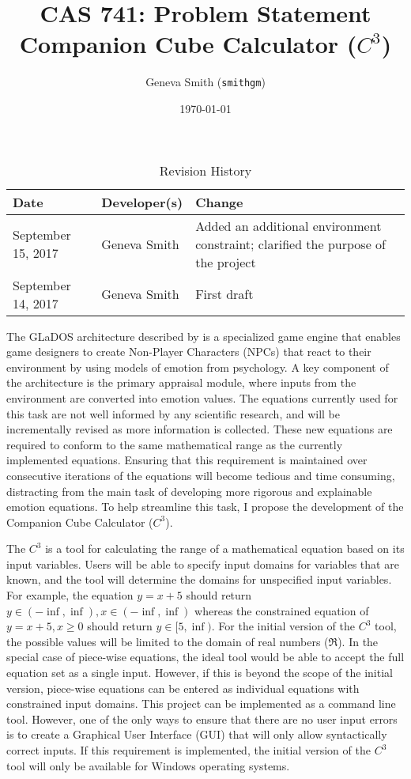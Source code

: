 \documentclass{article}
\title{CAS 741: Problem Statement\\Companion Cube Calculator ($C^{3}$)}
\author{Geneva Smith (\texttt{smithgm})}
\date{\today}
\begin{document}
\maketitle

\begin{table}[hp]
\caption{Revision History} \label{TblRevisionHistory}
\begin{tabularx}{\textwidth}{llX}
\toprule
\textbf{Date} & \textbf{Developer(s)} & \textbf{Change}\\
\midrule
September 15, 2017 & Geneva Smith & Added an additional environment constraint; 
clarified the purpose of the project \\
September 14, 2017 & Geneva Smith & First draft \\
\bottomrule
\end{tabularx}
\end{table}

The GLaDOS architecture described by \citet{glados} is a specialized game 
engine that enables game designers to create Non-Player Characters (NPCs) that 
react to their environment by using models of emotion from psychology. A key 
component of the architecture is the primary appraisal module, where inputs 
from the environment are converted into emotion values. The equations currently 
used for this task are not well informed by any scientific research, and will 
be incrementally revised as more information is collected. These new equations 
are required to conform to the same mathematical range as the currently 
implemented equations. Ensuring that this requirement is maintained over 
consecutive iterations of the equations will become tedious and time consuming, 
distracting from the main task of developing more rigorous and explainable 
emotion equations. To help streamline this task, I propose the development of 
the Companion Cube Calculator ($C^{3}$).

The $C^{3}$ is a tool for calculating the range of a mathematical equation 
based on its input variables. Users will be able to specify input domains for 
variables that are known, and the tool will determine the domains for 
unspecified input variables. For example, the equation $y = x + 5$ should 
return $y \in (-\inf, \inf), x \in (-\inf, \inf)$ whereas the constrained 
equation of $y = x + 5, x \geq 0$ should return $y \in [5, \inf)$. For the 
initial version of the $C^{3}$ tool, the possible values will be limited to the 
domain of real numbers ($\Re$). In the special case of piece-wise equations, 
the ideal tool would be able to accept the full equation set as a single input. 
However, if this is beyond the scope of the initial version, piece-wise 
equations can be entered as individual equations with constrained input 
domains. This project can be implemented as a command line tool. However, one 
of the only ways to ensure that there are no user input errors is to create a 
Graphical User Interface (GUI) that will only allow syntactically correct 
inputs. If this requirement is implemented, the initial version of the $C^{3}$ 
tool will only be available for Windows operating systems.
\end{document}
